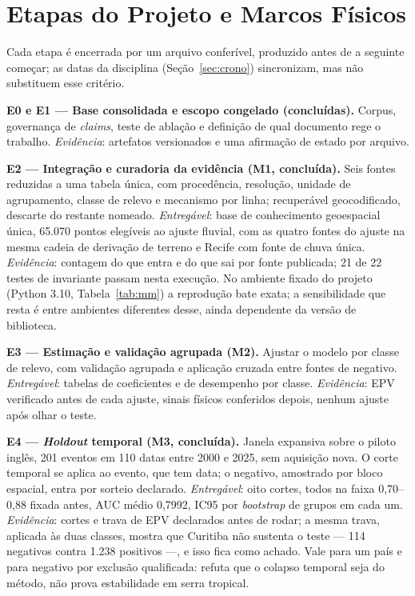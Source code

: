 \documentclass[conference]{IEEEtran}
\begin{document}
\section{Etapas do Projeto e Marcos Físicos}
\label{sec:etapas}

Cada etapa é encerrada por um arquivo conferível, produzido antes de a seguinte
começar; as datas da disciplina (Seção~\ref{sec:crono}) sincronizam, mas não
substituem esse critério.

\textbf{E0 e E1 --- Base consolidada e escopo congelado (concluídas).} Corpus,
governança de \emph{claims}, teste de ablação e definição de qual documento rege
o trabalho. \emph{Evidência}: artefatos versionados e uma afirmação de estado por
arquivo.

\textbf{E2 --- Integração e curadoria da evidência (M1, concluída).} Seis fontes
reduzidas a uma tabela única, com procedência, resolução, unidade de
agrupamento, classe de relevo e mecanismo por linha; recuperável geocodificado,
descarte do restante nomeado. \emph{Entregável}: base de conhecimento
geoespacial única, 65.070 pontos elegíveis ao ajuste fluvial, com as quatro
fontes do ajuste na mesma cadeia de derivação de terreno e Recife com fonte de
chuva única. \emph{Evidência}: contagem do que entra e do que sai por fonte
publicada; 21 de 22 testes de invariante passam nesta execução. No ambiente
fixado do projeto (Python 3.10, Tabela~\ref{tab:mm}) a reprodução bate exata;
a sensibilidade que resta é entre ambientes diferentes desse, ainda dependente
da versão de biblioteca.

\textbf{E3 --- Estimação e validação agrupada (M2).} Ajustar o modelo por classe
de relevo, com validação agrupada e aplicação cruzada entre fontes de negativo.
\emph{Entregável}: tabelas de coeficientes e de desempenho por classe.
\emph{Evidência}: EPV verificado antes de cada ajuste, sinais físicos conferidos
depois, nenhum ajuste após olhar o teste.

\textbf{E4 --- \emph{Holdout} temporal (M3, concluída).} Janela expansiva sobre o
piloto inglês, 201 eventos em 110 datas entre 2000 e 2025, sem aquisição nova. O
corte temporal se aplica ao evento, que tem data; o negativo, amostrado por bloco
espacial, entra por sorteio declarado. \emph{Entregável}: oito cortes, todos na
faixa 0,70--0,88 fixada antes, AUC médio 0,7992, IC95 por \emph{bootstrap} de
grupos em cada um. \emph{Evidência}: cortes e trava de EPV declarados antes de
rodar; a mesma trava, aplicada às duas classes, mostra que Curitiba não sustenta
o teste --- 114 negativos contra 1.238 positivos ---, e isso fica como achado.
Vale para um país e para negativo por exclusão qualificada: refuta que o colapso
temporal seja do método, não prova estabilidade em serra tropical.
\end{document}
